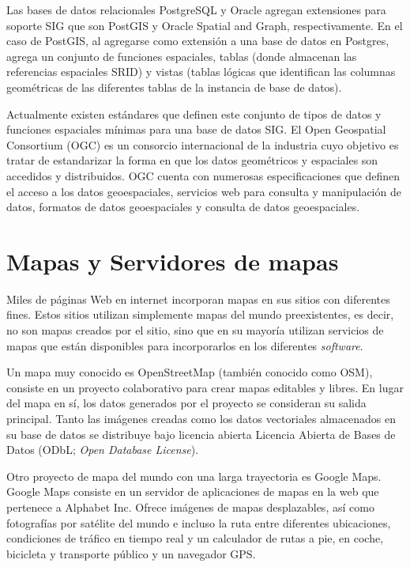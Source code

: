 Las bases de datos relacionales PostgreSQL y Oracle agregan extensiones para soporte SIG que son PostGIS y Oracle Spatial and Graph, respectivamente. En el caso de PostGIS, al agregarse como extensión a una base de datos en Postgres, agrega un conjunto de funciones espaciales, tablas (donde almacenan las referencias espaciales SRID) y vistas (tablas lógicas que identifican las columnas geométricas de las diferentes tablas de la instancia de base de datos).

Actualmente existen estándares que definen este conjunto de tipos de datos y funciones espaciales mínimas para una base de datos SIG. El Open Geospatial Consortium (OGC) es un consorcio internacional de la industria cuyo objetivo es tratar de estandarizar la forma en que los datos geométricos y espaciales son accedidos y distribuidos. OGC cuenta con numerosas especificaciones que definen el acceso a los datos geoespaciales, servicios web para consulta y manipulación de datos, formatos de datos geoespaciales y consulta de datos geoespaciales.

\section{Mapas y Servidores de mapas}

Miles de páginas Web en internet incorporan mapas en sus sitios con diferentes fines. Estos sitios utilizan simplemente mapas del mundo preexistentes, es decir, no son mapas creados por el sitio, sino que en su mayoría utilizan servicios de mapas que están disponibles para incorporarlos en los diferentes \textit{software}.

Un mapa muy conocido es OpenStreetMap (también conocido como OSM), consiste en un proyecto colaborativo para crear mapas editables y libres. En lugar del mapa en sí, los datos generados por el proyecto se consideran su salida principal. Tanto las imágenes creadas como los datos vectoriales almacenados en su base de datos se distribuye bajo licencia abierta Licencia Abierta de Bases de Datos (ODbL; \textit{Open Database License}).

Otro proyecto de mapa del mundo con una larga trayectoria es Google Maps. Google Maps consiste en un servidor de aplicaciones de mapas en la web que pertenece a Alphabet Inc. Ofrece imágenes de mapas desplazables, así como fotografías por satélite del mundo e incluso la ruta entre diferentes ubicaciones, condiciones de tráfico en tiempo real y un calculador de rutas a pie, en coche, bicicleta y transporte público y un navegador GPS.

